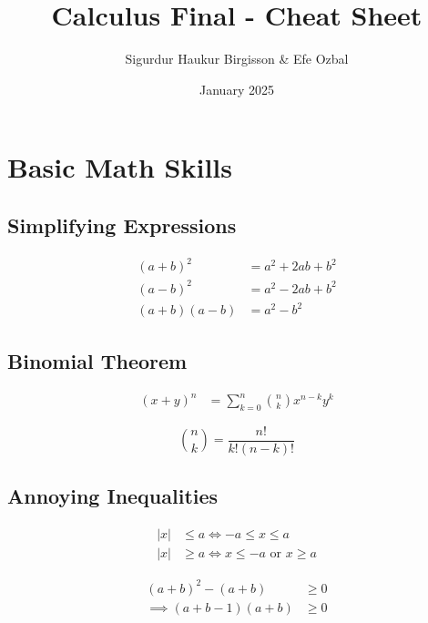 \documentclass[12pt]{article}
\title{Calculus Final - Cheat Sheet}
\date{January 2025}
\author{Sigurdur Haukur Birgisson \& Efe Ozbal}
\begin{document}
\maketitle

\section{Basic Math Skills}

\vspace{1cm}

\noindent
\begin{minipage}[t]{0.45\textwidth}
  \subsection*{Simplifying Expressions}
  \begin{align}
    (a+b)^2 &= a^2 + 2ab + b^2 \\
    (a-b)^2 &= a^2 - 2ab + b^2 \\
    (a+b)(a-b) &= a^2 - b^2
  \end{align}
\end{minipage}%
\hfill
\begin{minipage}[t]{0.45\textwidth}
  \subsection*{Binomial Theorem}
  \begin{align}
    (x+y)^n &= \sum_{k=0}^{n} \binom{n}{k} x^{n-k} y^k
  \end{align}

  \begin{equation}
    \binom{n}{k} = \frac{n!}{k!(n-k)!}
  \end{equation}
\end{minipage}

\subsection*{Annoying Inequalities}

\begin{align}
  |x| &\leq a \iff -a \leq x \leq a \\
  |x| &\geq a \iff x \leq -a \text{ or } x \geq a
\end{align}

\begin{align}
    (a + b)^2 - (a + b) &\geq 0 \\
  \implies (a + b - 1)(a + b) &\geq 0
\end{align}
\end{document}
